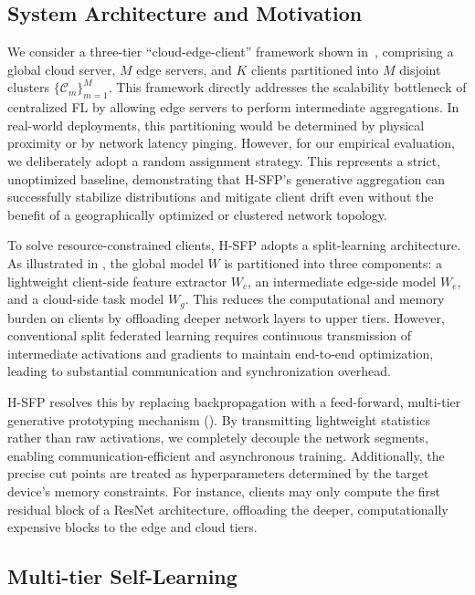 \subsection{System Architecture and Motivation}
\label{subsec:system_model}
We consider a three-tier ``cloud-edge-client'' framework shown in~, comprising a global cloud server, $M$ edge servers, and $K$ clients partitioned into $M$ disjoint clusters $\{\mathcal{C}_m\}_{m=1}^M$. This framework directly addresses the scalability bottleneck of centralized FL by allowing edge servers to perform intermediate aggregations. In real-world deployments, this partitioning would be determined by physical proximity or by network latency pinging. However, for our empirical evaluation, we deliberately adopt a random assignment strategy. This represents a strict, unoptimized baseline, demonstrating that H-SFP's generative aggregation can successfully stabilize distributions and mitigate client drift even without the benefit of a geographically optimized or clustered network topology.

To solve resource-constrained clients, H-SFP adopts a split-learning architecture. As illustrated in , the global model $W$ is partitioned into three components: a lightweight client-side feature extractor $W_c$, an intermediate edge-side model $W_e$, and a cloud-side task model $W_g$. This reduces the computational and memory burden on clients by offloading deeper network layers to upper tiers. However, conventional split federated learning requires continuous transmission of intermediate activations and gradients to maintain end-to-end optimization, leading to substantial communication and synchronization overhead.

H-SFP resolves this by replacing backpropagation with a feed-forward, multi-tier generative prototyping mechanism (). By transmitting lightweight statistics rather than raw activations, we completely decouple the network segments, enabling communication-efficient and asynchronous training. Additionally, the precise cut points are treated as hyperparameters determined by the target device's memory constraints. For instance, clients may only compute the first residual block of a ResNet architecture, offloading the deeper, computationally expensive blocks to the edge and cloud tiers.

\subsection{Multi-tier Self-Learning} 
\label{sec:multi_tier_learning}
    
